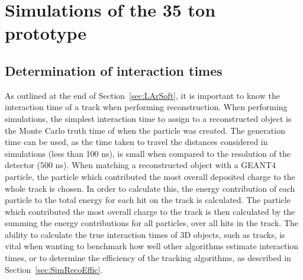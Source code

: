 
\newcommand{\BigO}[1]{\ensuremath{\operatorname{O}\bigl(#1\bigr)}}


\chapter{Simulations of the 35 ton prototype} \label{chap:35tonSim} %

\graphicspath{ {35tonSimulation/Figs/Raster/} {35tonSimulation/Figs/PDF/} {35tonSimulation/Figs/Vector/} }

\section{Determination of interaction times} \label{sec:SimInteractionTimes} %
As outlined at the end of Section~\ref{sec:LArSoft}, it is important to know the interaction time of a track when performing reconstruction. When performing simulations, the simplest interaction time to assign to a reconstructed object is the Monte Carlo truth time of when the particle was created. The generation time can be used, as the time taken to travel the distances considered in simulations (less than 100 ns), is small when compared to the resolution of the detector (500 ns). When matching a reconstructed object with a GEANT4 particle, the particle which contributed the most overall deposited charge to the whole track is chosen. In order to calculate this, the energy contribution of each particle to the total energy for each hit on the track is calculated. The particle which contributed the most overall charge to the track is then calculated by the summing the energy contributions for all particles, over all hits in the track. The ability to calculate the true interaction times of 3D objects, such as tracks, is vital when wanting to benchmark how well other algorithms estimate interaction times, or to determine the efficiency of the tracking algorithms, as described in Section~\ref{sec:SimRecoEffic}. \\

